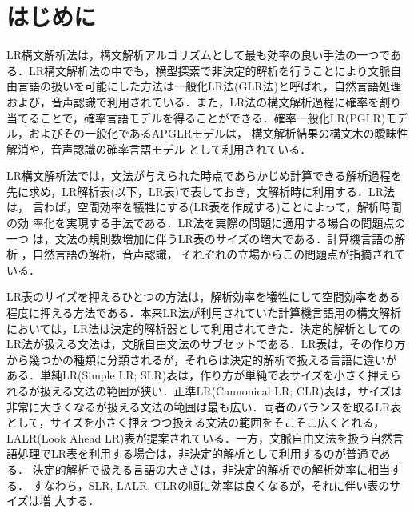 

\maketitle


\thispagestyle{empty}
\section{はじめに}

LR構文解析法は，構文解析アルゴリズムとして最も効率の良い手法の一つであ
る．LR構文解析法の中でも，横型探索で非決定的解析を行うことにより文脈自
由言語の扱いを可能にした方法は一般化LR法(GLR法)と呼ばれ，自然言語処理
および，音声認識で利用されている．また，LR法の構文解析過程に確率を割り
当てることで，確率言語モデルを得ることができる．確率一般化LR(PGLR)モデ
ル\cite{inui1998}，およびその一般化であるAPGLRモデル\cite{akiba2001}は，
構文解析結果の構文木の曖昧性解消や，音声認識の確率言語モデル
\cite{nagai1994,imai1999,akiba2001}として利用されている．

LR構文解析法では，文法が与えられた時点であらかじめ計算できる解析過程を
先に求め，LR解析表(以下，LR表)で表しておき，文解析時に利用する．LR法は，
言わば，空間効率を犠牲にする(LR表を作成する)ことによって，解析時間の効
率化を実現する手法である．LR法を実際の問題に適用する場合の問題点の一つ
は，文法の規則数増加に伴うLR表のサイズの増大である．計算機言語の解析
\cite{aho1986}，自然言語の解析\cite{luk2000}，音声認識\cite{nagai1994}，
それぞれの立場からこの問題点が指摘されている．

LR表のサイズを押えるひとつの方法は，解析効率を犠牲にして空間効率をある
程度に押える方法である．本来LR法が利用されていた計算機言語用の構文解析
においては，LR法は決定的解析器として利用されてきた．決定的解析としての
LR法が扱える文法は，文脈自由文法のサブセットである．LR表は，その作り方
から幾つかの種類に分類されるが，それらは決定的解析で扱える言語に違いが
ある．単純LR(Simple LR; SLR)表は，作り方が単純で表サイズを小さく押えら
れるが扱える文法の範囲が狭い．正準LR(Cannonical LR; CLR)表は，サイズは
非常に大きくなるが扱える文法の範囲は最も広い．両者のバランスを取るLR表
として，サイズを小さく押えつつ扱える文法の範囲をそこそこ広くとれる，
LALR(Look Ahead LR)表が提案されている．一方，文脈自由文法を扱う自然言
語処理でLR表を利用する場合は，非決定的解析として利用するのが普通である．
決定的解析で扱える言語の大きさは，非決定的解析での解析効率に相当する．
すなわち，SLR, LALR, CLRの順に効率は良くなるが，それに伴い表のサイズは増
大する．

